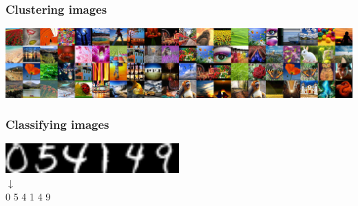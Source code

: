 \begin{frame}
  \frametitle{Clustering images}

  \begin{center}
  \includegraphics[width=\textwidth]{../../code/image_data/flickr_vivid_sample.png}
  \end{center}

\end{frame}


\begin{frame}
  \frametitle{Classifying images}

  \begin{center}
    \includegraphics[width=0.5\textwidth]{ocr.png} \\
  \Huge{$\downarrow$} \\
  \Huge{0 \hskip10pt 5 \hskip10pt 4 \hskip10pt 1 \hskip10pt 4 \hskip10pt 9}
  \end{center}

\end{frame}

